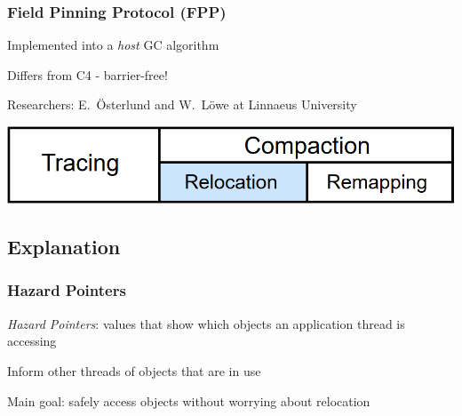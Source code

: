 \documentclass{beamer}
\newcommand{\linespace}{\vskip 0.25cm}
\begin{document}
\begin{frame}

\frametitle{Field Pinning Protocol (FPP)}

Implemented into a \emph{host} GC algorithm

\linespace
\linespace

Differs from C4 - barrier-free!

\linespace
\linespace

Researchers: E.~\"{O}sterlund and W.~L\"{o}we at Linnaeus University

\linespace
\linespace
\linespace

\begin{center}
\includegraphics[width=.85\textwidth]{Illustrations/gc_cycle_locator_relocation.png}
\end{center}

\end{frame}



\subsection*{Explanation}

\begin{frame}

\frametitle{Hazard Pointers}

\emph{Hazard Pointers}: values that show which objects an application thread is accessing

\linespace
\linespace

Inform other threads of objects that are in use

\linespace
\linespace

Main goal: safely access objects without worrying about relocation

\end{frame}
\end{document}
